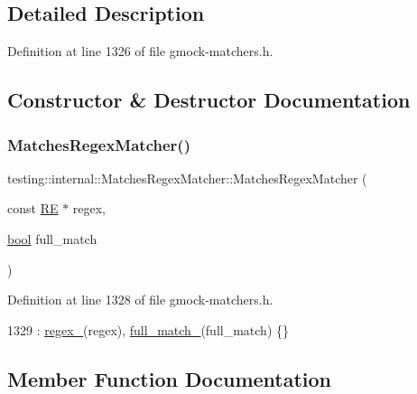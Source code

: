 \subsection{Detailed Description}


Definition at line 1326 of file gmock-\/matchers.\+h.



\subsection{Constructor \& Destructor Documentation}
\mbox{\label{classtesting_1_1internal_1_1MatchesRegexMatcher_acce0beb9c72166b1c5771869cfebedd1}} 
\subsubsection{\texorpdfstring{Matches\+Regex\+Matcher()}{MatchesRegexMatcher()}}
{\footnotesize\ttfamily testing\+::internal\+::\+Matches\+Regex\+Matcher\+::\+Matches\+Regex\+Matcher (\begin{DoxyParamCaption}\item[{const \hyperlink{classtesting_1_1internal_1_1RE}{RE} $\ast$}]{regex,  }\item[{\hyperlink{classbool}{bool}}]{full\+\_\+match }\end{DoxyParamCaption})\hspace{0.3cm}{\ttfamily [inline]}}



Definition at line 1328 of file gmock-\/matchers.\+h.


\begin{DoxyCode}
1329       : \hyperlink{classtesting_1_1internal_1_1MatchesRegexMatcher_a585228fef5cc1158f064aa4f3eaf882e}{regex\_}(regex), \hyperlink{classtesting_1_1internal_1_1MatchesRegexMatcher_ac2690d696a5a1ec134a90c5cc21b2072}{full\_match\_}(full\_match) \{\}
\end{DoxyCode}


\subsection{Member Function Documentation}
\mbox{\label{classtesting_1_1internal_1_1MatchesRegexMatcher_a63154c9c572c1e44a130d58539fde707}} 
